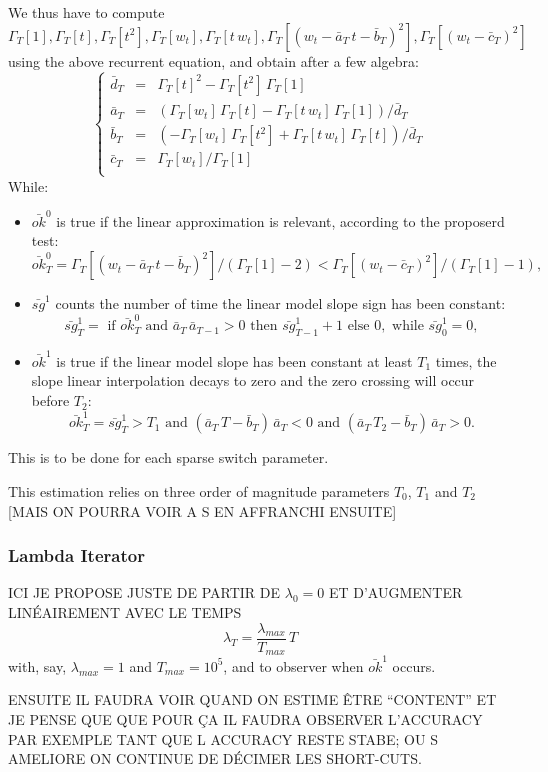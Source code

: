 \documentclass{article}\usepackage[width=17cm,height=22cm]{geometry}\usepackage[english]{babel} \usepackage[utf8]{inputenc}\usepackage{fancyvrb} \usepackage{authblk} \usepackage{hyperref}\usepackage{outlines} \usepackage{graphicx} \usepackage{color}\DeclareGraphicsExtensions{.pdf,.png,.jpg}\definecolor{vthierry}{RGB}{80,0,120}\newcommand{\vthierry}[1]{{\color{vthierry}{#1}}}\definecolor{thalita}{RGB}{51, 153, 255}\newcommand{\thalita}[1]{{\color{thalita}{#1}}}
\begin{document}
We thus have to compute $\Gamma_T[1], \Gamma_T[t], \Gamma_T[t^2], \Gamma_T[w_t], \Gamma_T[t \, w_t], \Gamma_T[(w_t - \bar{a}_T \, t - \bar{b}_T)^2], \Gamma_T[(w_t - \bar{c}_T)^2]$ using the above recurrent equation, and obtain after a few algebra:
\[\left\{\begin{array}{rcl}
\bar{d}_T &=& \Gamma_T[t]^2 - \Gamma_T[t^2] \, \Gamma_T[1] \\
\bar{a}_T &=& \left(\Gamma_T[w_t] \, \Gamma_T[t] - \Gamma_T[t \, w_t] \, \Gamma_T[1]\right) / \bar{d}_T \\
\bar{b}_T &=& \left(-\Gamma_T[w_t] \, \Gamma_T[t^2] + \Gamma_T[t \, w_t] \, \Gamma_T[t]\right) / \bar{d}_T \\
\bar{c}_T &=& \Gamma_T[w_t] / \Gamma_T[1] \\
\end{array}\right.\]
While: \begin{itemize}
\item $\bar{ok}^0$ is true if the linear approximation is relevant, according to the proposerd test:
\[ \bar{ok}^0_T = \Gamma_T[(w_t - \bar{a}_T \, t - \bar{b}_T)^2] / (\Gamma_T[1] - 2) < \Gamma_T[(w_t - \bar{c}_T)^2] / (\Gamma_T[1] - 1), \]
\item $\bar{sg}^1$ counts the number of time the linear model slope sign has been constant:
\[ \bar{sg}^1_T = \mbox{ if } \bar{ok}^0_T \mbox{ and } \bar{a}_T \, \bar{a}_{T-1} > 0 \mbox{ then } \bar{sg}^1_{T-1} + 1 \mbox{ else } 0, \mbox{ while } \bar{sg}^1_0 = 0, \]
\item $\bar{ok}^1$ is true if the linear model slope has been constant at least $T_1$ times, the slope linear interpolation decays to zero and the zero crossing will occur before $T_2$:
\[ \bar{ok}^1_T = \bar{sg}^1_T > T_1 \mbox{ and } (\bar{a}_T \, T - \bar{b}_T) \, \bar{a}_T < 0 \mbox{ and } (\bar{a}_T \, T_2 - \bar{b}_T) \, \bar{a}_T > 0. \]
\end{itemize}

This is to be done for each sparse switch parameter.

This estimation relies on three order of magnitude parameters $T_0$, $T_1$ and $T_2$ [MAIS ON POURRA VOIR A S EN AFFRANCHI ENSUITE]

\subsubsection*{Lambda Iterator}

ICI JE PROPOSE JUSTE DE PARTIR DE $\lambda_0 = 0$ ET D'AUGMENTER LINÉAIREMENT AVEC LE TEMPS 
\[
\lambda_T = \frac{\lambda_{max}}{T_{max}} \, T 
\]
with, say, $\lambda_{max} = 1$ and $T_{max} = 10^5$, and to observer when $\bar{ok}^1$ occurs.

ENSUITE IL FAUDRA VOIR QUAND ON ESTIME ÊTRE ``CONTENT'' ET JE PENSE QUE QUE POUR ÇA IL FAUDRA OBSERVER L'ACCURACY PAR EXEMPLE TANT QUE L ACCURACY RESTE STABE; OU S AMELIORE ON CONTINUE DE DÉCIMER LES SHORT-CUTS.
\end{document}
